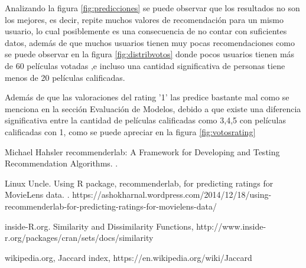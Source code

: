 \documentclass{sciposter}
\begin{document}
\begin{multicols}{3}
Analizando la figura \ref{fig:predicciones}  se puede observar que los resultados no son los mejores, es decir, repite muchos valores de recomendaci\'on para un mismo usuario, lo cual posiblemente es una consecuencia de no contar con suficientes datos, adem\'as de que muchos usuarios tienen muy pocas recomendaciones como se puede observar en la figura \ref{fig:distribvotos} donde pocos usuarios tienen m\'as de 60 pel\'iculas votadas ,e incluso una cantidad significativa de personas tiene menos de 20 pel\'iculas calificadas.

Adem\'as de que las valoraciones del rating '1' las predice bastante mal como se menciona en la secci\'on Evaluaci\'on de Modelos, debido a que existe una diferencia significativa entre la cantidad de pel\'iculas calificadas como 3,4,5 con pel\'iculas calificadas con 1, como se puede apreciar en la figura \ref{fig:votosrating}
\\
 

\begin{thebibliography}{1}

Michael Hahsler
\newblock recommenderlab: A Framework for Developing and
Testing Recommendation Algorithms.
.

Linux Uncle.
\newblock Using R package, recommenderlab, for predicting ratings for MovieLens data.
.
\newblock  https://ashokharnal.wordpress.com/2014/12/18/using-recommenderlab-for-predicting-ratings-for-movielens-data/


inside-R.org.
\newblock Similarity and Dissimilarity Functions,
\newblock http://www.inside-r.org/packages/cran/sets/docs/similarity


wikipedia.org,
\newblock Jaccard index,
\newblock  https://en.wikipedia.org/wiki/Jaccard




\end{thebibliography}

\end{multicols}
\end{document}
